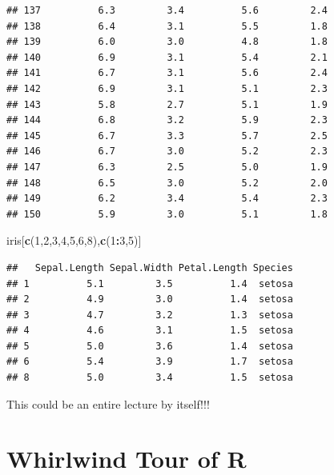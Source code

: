 \documentclass[]{book}
\newenvironment{Shaded}{\begin{snugshade}}{\end{snugshade}}
\newcommand{\KeywordTok}[1]{\textcolor[rgb]{0.13,0.29,0.53}{\textbf{#1}}}
\newcommand{\DecValTok}[1]{\textcolor[rgb]{0.00,0.00,0.81}{#1}}
\newcommand{\StringTok}[1]{\textcolor[rgb]{0.31,0.60,0.02}{#1}}
\newcommand{\OperatorTok}[1]{\textcolor[rgb]{0.81,0.36,0.00}{\textbf{#1}}}
\newcommand{\NormalTok}[1]{#1}
\theoremstyle{definition}
\theoremstyle{definition}
\theoremstyle{definition}
\theoremstyle{remark}
\begin{document}
\begin{verbatim}
## 137          6.3         3.4          5.6         2.4
## 138          6.4         3.1          5.5         1.8
## 139          6.0         3.0          4.8         1.8
## 140          6.9         3.1          5.4         2.1
## 141          6.7         3.1          5.6         2.4
## 142          6.9         3.1          5.1         2.3
## 143          5.8         2.7          5.1         1.9
## 144          6.8         3.2          5.9         2.3
## 145          6.7         3.3          5.7         2.5
## 146          6.7         3.0          5.2         2.3
## 147          6.3         2.5          5.0         1.9
## 148          6.5         3.0          5.2         2.0
## 149          6.2         3.4          5.4         2.3
## 150          5.9         3.0          5.1         1.8
\end{verbatim}

\begin{Shaded}
\begin{Highlighting}[]
\NormalTok{iris[}\KeywordTok{c}\NormalTok{(}\DecValTok{1}\NormalTok{,}\DecValTok{2}\NormalTok{,}\DecValTok{3}\NormalTok{,}\DecValTok{4}\NormalTok{,}\DecValTok{5}\NormalTok{,}\DecValTok{6}\NormalTok{,}\DecValTok{8}\NormalTok{),}\KeywordTok{c}\NormalTok{(}\DecValTok{1}\OperatorTok{:}\DecValTok{3}\NormalTok{,}\DecValTok{5}\NormalTok{)]}
\end{Highlighting}
\end{Shaded}

\begin{verbatim}
##   Sepal.Length Sepal.Width Petal.Length Species
## 1          5.1         3.5          1.4  setosa
## 2          4.9         3.0          1.4  setosa
## 3          4.7         3.2          1.3  setosa
## 4          4.6         3.1          1.5  setosa
## 5          5.0         3.6          1.4  setosa
## 6          5.4         3.9          1.7  setosa
## 8          5.0         3.4          1.5  setosa
\end{verbatim}

\begin{Shaded}
\end{Shaded}

This could be an entire lecture by itself!!!

\section{Whirlwind Tour of R}\label{whirlwind-tour-of-r}
\end{document}
